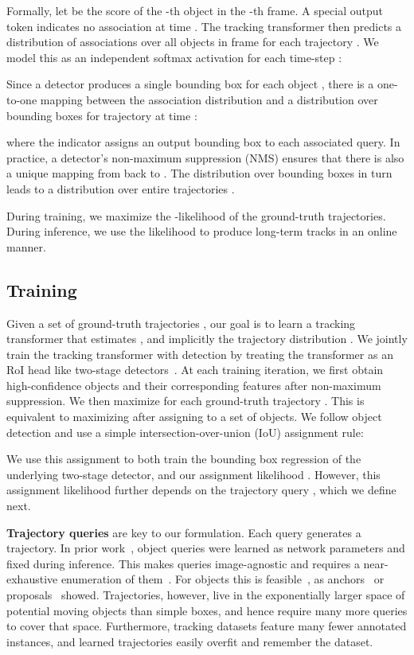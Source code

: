 \documentclass[10pt,twocolumn,letterpaper]{article}
\renewcommand{\paragraph}[1]{\noindent\textbf{#1}}
\let\oldsubsection\subsection
\renewcommand{\subsection}[1]{\vspace{-1mm}\oldsubsection{#1}\vspace{-1mm}}
\newcommand{\lblsec}[1]{\label{sec:#1}}
\begin{document}
Formally, let  be the score of the -th object in the -th frame.
A special output token  indicates no association at time .
The tracking transformer then predicts a distribution of associations over all objects  in frame   for each trajectory .
We model this as an independent softmax activation for each time-step :

Since a detector produces a single bounding box  for each object , there is a one-to-one mapping between the association distribution  and a distribution  over bounding boxes for trajectory  at time :

where the indicator  assigns an output bounding box to each associated query.
In practice, a detector's non-maximum suppression (NMS) ensures that there is also a unique mapping from  back to .
The distribution over bounding boxes in turn leads to a distribution over entire trajectories 
.

During training, we maximize the -likelihood of the ground-truth trajectories.
During inference, we use the likelihood to produce long-term tracks in an 
online manner.


\subsection{Training}
Given a set of ground-truth trajectories , our goal is to learn a tracking transformer that estimates , and implicitly the trajectory distribution .
We jointly train the tracking transformer with detection by treating the transformer as 
an RoI head like two-stage detectors~\cite{ren2015faster}.
At each training iteration, we first obtain high-confidence objects  and their corresponding features  after non-maximum suppression.
We then maximize  for each ground-truth trajectory .
This is equivalent to maximizing  after assigning  to a set of objects.
We follow object detection and use a simple intersection-over-union (IoU) assignment rule:

We use this assignment to both train the bounding box regression of the underlying two-stage detector, and our assignment likelihood .
However, this assignment likelihood further depends on the trajectory query , which we define next.

\paragraph{Trajectory queries}
\lblsec{queries}
are key to our formulation. Each query  generates a trajectory.
In prior work~\cite{carion2020end}, object queries were learned as network parameters and fixed during inference.
This makes queries image-agnostic and requires a near-exhaustive enumeration of them~\cite{zhu2020deformable,sun2020rethinking,liu2021group}.
For objects this is feasible~\cite{carion2020end}, as anchors~\cite{lin2017focal} or proposals~\cite{sun2020sparse} showed.
Trajectories, however, live in the exponentially larger space of potential moving objects than simple boxes, and hence require many more queries to cover that space.
Furthermore, tracking datasets feature many fewer annotated instances, and learned trajectories easily overfit and remember the dataset.
\end{document}
